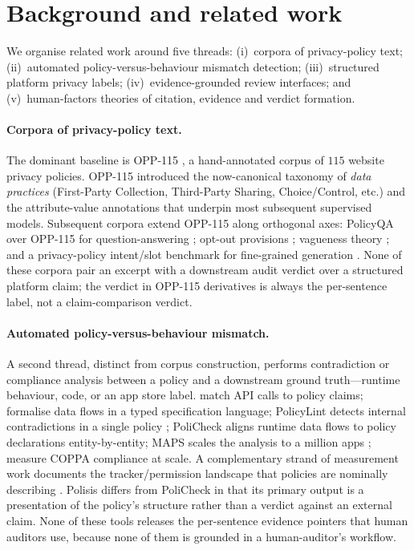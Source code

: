 \documentclass[11pt,a4paper]{article}
\begin{document}
\section{Background and related work}\label{sec:related}
We organise related work around five threads:
(i)~corpora of privacy-policy text;
(ii)~automated policy-versus-behaviour mismatch detection;
(iii)~structured platform privacy labels;
(iv)~evidence-grounded review interfaces; and
(v)~human-factors theories of citation, evidence and verdict
formation.

\paragraph{Corpora of privacy-policy text.}
The dominant baseline is OPP-115
\citep{wilson2016creation}, a hand-annotated corpus of $115$ website
privacy policies. OPP-115 introduced the now-canonical taxonomy of
\emph{data practices} (First-Party Collection, Third-Party Sharing,
Choice/Control, etc.) and the attribute-value annotations that
underpin most subsequent supervised models. Subsequent corpora extend
OPP-115 along orthogonal axes: PolicyQA over OPP-115 for
question-answering \citep{ravichander2019question}; opt-out provisions
\citep{sathyendra2017identifying}; vagueness theory
\citep{bhatia2016theory}; and a privacy-policy intent/slot
benchmark for fine-grained generation
\citep{ahmad2021intent}. None of these corpora pair an excerpt with
a downstream audit verdict over a structured platform claim; the
verdict in OPP-115 derivatives is always the per-sentence label, not a
claim-comparison verdict.

\paragraph{Automated policy-versus-behaviour mismatch.}
A second thread, distinct from corpus construction, performs
contradiction or compliance analysis between a policy and a downstream
ground truth---runtime behaviour, code, or an app store label.
\citet{slavin2016toward} match API calls to policy claims;
\citet{breaux2014eddy} formalise data flows in a typed
specification language; PolicyLint detects internal contradictions
in a single policy \citep{andow2019policylint};
PoliCheck \citep{andow2020policheck} aligns runtime data flows to
policy declarations entity-by-entity; MAPS scales the
analysis to a million apps \citep{zimmeck2019maps,zimmeck2017automated};
\citet{reyes2018wont} measure COPPA compliance at scale.
A complementary strand of measurement work documents the
tracker/permission landscape that policies are nominally describing
\citep{razaghpanah2018apps,englehardt2016online,reardon2019fifty,ren2018bug}.
Polisis \citep{harkous2018polisis} differs from PoliCheck in that
its primary output is a presentation of the policy's structure rather
than a verdict against an external claim. None of these tools releases
the per-sentence evidence pointers that human auditors use, because
none of them is grounded in a human-auditor's workflow.
\end{document}
